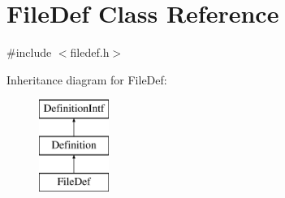 \hypertarget{class_file_def}{}\section{File\+Def Class Reference}
\label{class_file_def}


{\ttfamily \#include $<$filedef.\+h$>$}

Inheritance diagram for File\+Def\+:\begin{figure}[H]
\begin{center}
\leavevmode
\includegraphics[height=3.000000cm]{class_file_def}
\end{center}
\end{figure}
